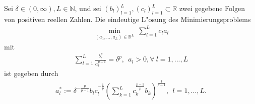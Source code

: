 \begin{lem}\label{opt}
Sei $\delta\in(0,\infty),L\in\mathbb{N}$, und sei $(b_l)_{l=1}^L,(c_l)_{l=1}^L\subset\mathbb{R}$ zwei gegebene Folgen von positiven reellen Zahlen. Die eindeutige L"osung des Minimierungsproblems
\begin{align*}
\min_{(a_1,...,a_L)\in\mathbb{R}^L} \ \sum_{l=1}^L c_la_l
\end{align*}
mit
\begin{align*}
\sum_{l=1}^L \frac{b_l^p}{a_l^{p-1}}=\delta^p, \ \ a_l>0, \forall\  l=1,...,L
\end{align*}
ist gegeben durch
\begin{align*}
a_l^*:=\delta^{-\frac{p}{p-1}} b_l c_l^{-\frac{1}{p}}\left(\sum_{k=1}^L c_k^{\frac{p-1}{p}}b_k\right)^{\frac{1}{p-1}}, \ \ l=1,...,L.
\end{align*}
\end{lem}
